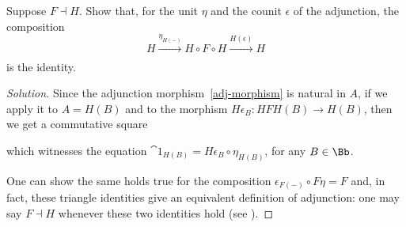 \begin{exercise!}\label{unit-counit-identity}
    Suppose $F \dashv H$. Show that, for the unit $\eta$ 
    and the counit $\epsilon$ of the adjunction,
    the composition
    \begin{equation*}
        H \xrightarrow[]{\eta_{H(-)}} H \circ F \circ H \xrightarrow[]{H(\epsilon)} H
    \end{equation*}
    is the identity.
    \begin{proof}[Solution]
        
        Since the adjunction morphism~\eqref{adj-morphism}
        is natural in $A$, if we apply it to $A=H(B)$ and
        to the morphism $H\epsilon_{B} : HFH(B) \to H(B)$,
        then we get a commutative square
        \begin{center}
        \end{center}
        which witnesses the equation $\cat{1}_{H(B)} = H\epsilon_{B} \circ \eta_{H(B)}$, for any $B \in \Bb$.

        One can show the same holds true for the composition $\epsilon_{F(-)} \circ F\eta = F$ and, in fact, these triangle identities
        give an equivalent definition of adjunction: one may say $F \dashv H$
        whenever these two identities hold (see \parencite[Proposition 4.2.6]{riehl}).
    \end{proof}
\end{exercise!}

